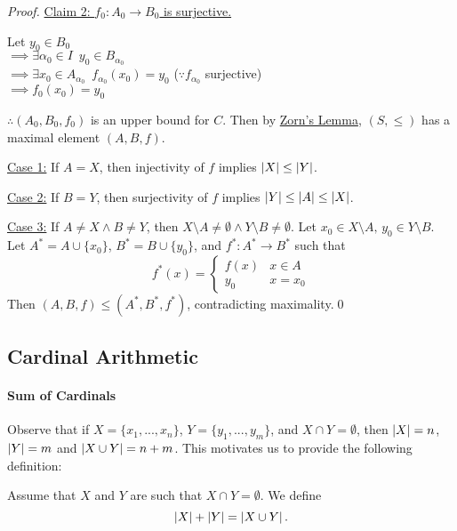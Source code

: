 \documentclass[notoc,notitlepage]{tufte-book}
\begin{document}
\begin{proof}
  \noindent\underline{Claim 2: $f_0 : A_0 \to B_0$ is surjective.}

  Let $y_0 \in B_0$ \\
  \noindent $\implies \exists \alpha_0 \in I \enspace y_0 \in B_{\alpha_0}$ \\
  \noindent $\implies \exists x_0 \in A_{\alpha_0} \enspace f_{\alpha_0}(x_0) = y_0$ ($\because f_{\alpha_0}$ surjective) \\
  \noindent $\implies f_0(x_0) = y_0$

  $\therefore (A_0, B_0, f_0)$ is an upper bound for $C$. Then by \hyperref[axiom:zorn_s_lemma]{Zorn's Lemma}, $(S, \leq)$ has a maximal element $(A, B, f)$.

  \noindent\underline{Case 1:} If $A = X$, then injectivity of $f$ implies $\left|X\right| \leq \left|Y\right|$.
  
  \noindent\underline{Case 2:} If $B = Y$, then surjectivity of $f$ implies $\left|Y\right| \leq \left|A\right| \leq \left|X\right|$.

  \noindent\underline{Case 3:} If $A \neq X \land B \neq Y$, then $X \setminus A \neq \emptyset \land Y \setminus B \neq \emptyset$. Let $x_0 \in X \setminus A, \, y_0 \in Y \setminus B$. Let $A^* = A \cup \{x_0\}$, $B^* = B \cup \{ y_0 \}$, and $f^* : A^* \to B^*$ such that
  \begin{equation*}
    f^*(x) = \begin{cases}
      f(x) & x \in A \\
      y_0  & x = x_0
    \end{cases}
  \end{equation*}
  Then $(A, B, f) \leq (A^*, B^*, f^*)$, contradicting maximality.\qed
\end{proof}

\subsection{Cardinal Arithmetic}%
\label{sub:cardinal_arithmetic}

\paragraph{Sum of Cardinals} Observe that if $X = \{ x_1, ..., x_n\}$, $Y = \{ y_1, ..., y_m\}$, and $X \cap Y = \emptyset$, then $\left|X\right| = n$, $\left|Y\right| = m$ and $\left|X \cup Y\right| = n + m$. This motivates us to provide the following definition:

\begin{defn}
\label{defn:sum_of_cardinals}
  Assume that $X$ and $Y$ are such that $X \cap Y = \emptyset$. We define
  \begin{equation*}
    \left|X\right| + \left|Y\right| = \left|X \cup Y\right|.
  \end{equation*}
\end{defn}
\end{document}
